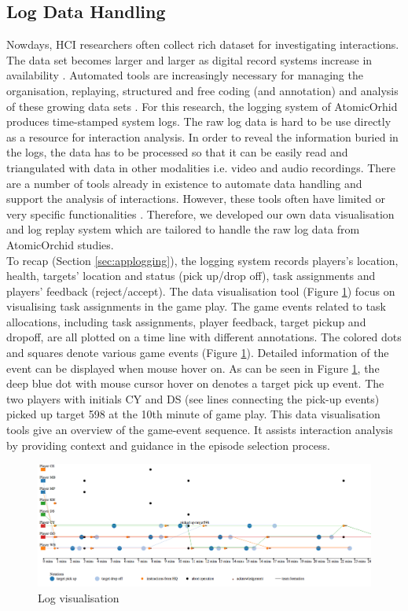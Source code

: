 \subsection{Log Data Handling} \label{sec:aprloghandling}
Nowdays, \acf{HCI} researchers often collect rich dataset for investigating interactions. The data set becomes larger and larger as digital record systems increase in availability \cite{Brundell}. Automated tools are increasingly necessary for managing the organisation, replaying, structured and free coding (and annotation) and analysis of these growing data sets \cite{Brundell}. For this research, the logging system of AtomicOrhid produces time-stamped system logs. The raw log data is hard to be use directly as a resource for interaction analysis. In order to reveal the information buried in the logs, the data has to be processed so that it can be easily read and triangulated with data in other modalities i.e.  video and audio recordings. There are a number of tools already in existence to automate data handling and support the analysis of interactions. However, these tools often have limited or very specific functionalities \cite{Brundell}. Therefore, we developed our own data visualisation and log replay system which are tailored to handle the raw log data from AtomicOrchid studies.\\

To recap (Section \ref{sec:applogging}), the logging system records players's location, health, targets' location and status (pick up/drop off), task assignments and players' feedback (reject/accept). The data visualisation tool (Figure \ref{fig:logvis}) focus on visualising task assignments in the game play. The game events related to task allocations, including task assignments, player feedback, target pickup and dropoff, are all plotted on a time line with different annotations. The colored dots and squares denote various game events (Figure \ref{fig:logvis}). Detailed information of the event can be displayed when mouse hover on. As can be seen in Figure \ref{fig:logvis}, the deep blue dot with mouse cursor hover on denotes a target pick up event. The two players with initials CY and DS (see lines connecting the pick-up events) picked up target 598 at the 10th minute of game play. This data visualisation tools give an overview of the game-event sequence. It assists interaction analysis by providing context and guidance in the episode selection process. \\

\begin{figure}[h]
  \centering
  \includegraphics[width=1\textwidth]{img/methodology/logVisualisation}
  \caption{Log visualisation}
  \label{fig:logvis}
\end{figure}

